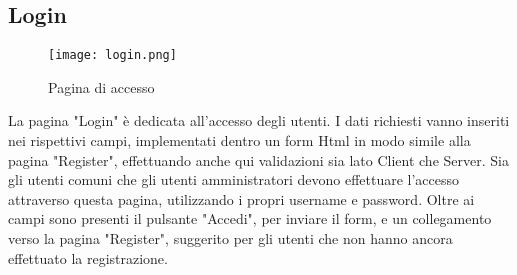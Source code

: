 \documentclass[binding=0.6cm, oneside, noexaminfo, italian]{sapthesis}
\begin{document}
\subsection{Login}
\begin{figure}[h]
    \centering
    \texttt{[image: login.png]}
    \caption{Pagina di accesso}
    \label{fig:login}
\end{figure}
La pagina "Login" è dedicata all'accesso degli utenti. I dati richiesti vanno inseriti nei rispettivi campi, implementati dentro un form Html in modo simile alla pagina "Register", effettuando anche qui validazioni sia lato Client che Server. Sia gli utenti comuni che gli utenti amministratori devono effettuare l'accesso attraverso questa pagina, utilizzando i propri username e password. Oltre ai campi sono presenti il pulsante "Accedi", per inviare il form, e un collegamento verso la pagina "Register", suggerito per gli utenti che non hanno ancora effettuato la registrazione.
\end{document}
